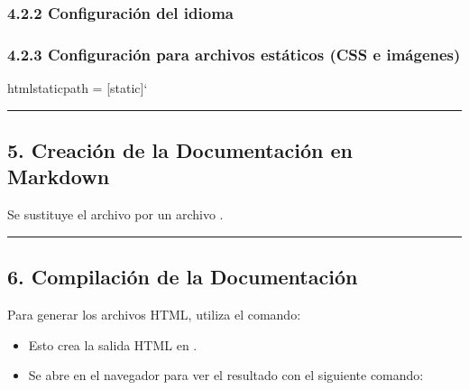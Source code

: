 \documentclass[a4paper,10pt,oneside,spanish,openany]{sphinxmanual}
\begin{document}
\subsubsection{4.2.2 Configuración del idioma}
\label{\detokenize{configuracion_inicial/003.Creacion_proyecto_Sphinx:configuracion-del-idioma}}
\begin{sphinxVerbatim}[commandchars=\\\{\}]
    
\end{sphinxVerbatim}


\subsubsection{4.2.3 Configuración para archivos estáticos (CSS e imágenes)}
\label{\detokenize{configuracion_inicial/003.Creacion_proyecto_Sphinx:configuracion-para-archivos-estaticos-css-e-imagenes}}
\begin{sphinxVerbatim}[commandchars=\\\{\}]
html\PYGZus{}static\PYGZus{}path = [\PYGZsq{}\PYGZus{}static\PYGZsq{}]` 
\end{sphinxVerbatim}


\bigskip\hrule\bigskip



\subsection{5. Creación de la Documentación en Markdown}
\label{\detokenize{configuracion_inicial/003.Creacion_proyecto_Sphinx:creacion-de-la-documentacion-en-markdown}}
\sphinxAtStartPar
Se sustituye el archivo  por un archivo .


\bigskip\hrule\bigskip



\subsection{6. Compilación de la Documentación}
\label{\detokenize{configuracion_inicial/003.Creacion_proyecto_Sphinx:compilacion-de-la-documentacion}}
\sphinxAtStartPar
Para generar los archivos HTML, utiliza el comando:

\begin{sphinxVerbatim}[commandchars=\\\{\}]
 
\end{sphinxVerbatim}
\begin{itemize}
\item {} 
\sphinxAtStartPar
Esto crea la salida HTML en .

\item {} 
\sphinxAtStartPar
Se abre  en el navegador para ver el resultado con el siguiente comando:

\end{itemize}
\end{document}
